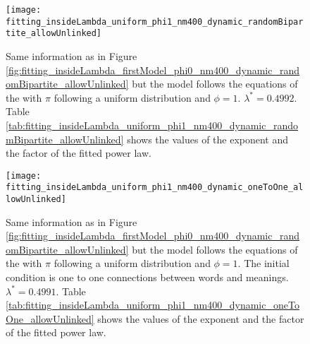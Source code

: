 \begin{figure}
  \centering
  \texttt{[image: fitting\_insideLambda\_uniform\_phi1\_nm400\_dynamic\_randomBipartite\_allowUnlinked]}
  \caption{Same information as in Figure \ref{fig:fitting_insideLambda_firstModel_phi0_nm400_dynamic_randomBipartite_allowUnlinked} but the model follows the equations of the \secondmodel{} with $\pi$ following a uniform distribution and $\phi=1$. $\lambda^*=0.4992$.
Table \ref{tab:fitting_insideLambda_uniform_phi1_nm400_dynamic_randomBipartite_allowUnlinked} shows the values of the exponent and the factor of the fitted power law.}
  \label{fig:fitting_insideLambda_uniform_phi1_nm400_dynamic_randomBipartite_allowUnlinked}
\end{figure}

\begin{figure}
  \centering
  \texttt{[image: fitting\_insideLambda\_uniform\_phi1\_nm400\_dynamic\_oneToOne\_allowUnlinked]}
  \caption{Same information as in Figure \ref{fig:fitting_insideLambda_firstModel_phi0_nm400_dynamic_randomBipartite_allowUnlinked} but the model follows the equations of the \secondmodel{} with $\pi$ following a uniform distribution and $\phi=1$. The initial condition is one to one connections between words and meanings. $\lambda^*=0.4991$.
Table \ref{tab:fitting_insideLambda_uniform_phi1_nm400_dynamic_oneToOne_allowUnlinked} shows the values of the exponent and the factor of the fitted power law.}
  \label{fig:fitting_insideLambda_uniform_phi1_nm400_dynamic_oneToOne_allowUnlinked}
\end{figure}






